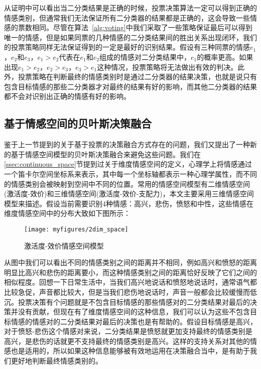 从证明中可以看出当二分类结果是正确的时候，投票决策算法一定可以得到正确的情感类别，但通常我们无法保证所有二分类器的结果都是正确的，这会导致一些情感的票数相同。尽管在算法~\ref{alg:voting}中我们采取了一些策略保证最后可以得到唯一的情感，但是如果同票的几种情感的二分类结果间的胜出关系出现闭环，我们的投票策略同样无法保证得到的一定是最好的识别结果。假设有三种同票的情感$e_1$，$e_2$和$e_3$，$e_1>e_2$代表在$e_1$和$e_2$组成的情感对二分类结果中，$e_1$的概率更高。如果出现$e_1>e_2$，$e_2>e_3$，$e_3>e_1$这种情况，投票策略将无法做出有效的判决。此外，投票策略在判断最终的情感类别时是通过二分类器的结果决策，也就是说只有包含目标情感的那些二分类器才对最终的结果有好的影响，而其他二分类器的结果都不会对识别出正确的情感有好的影响。

\subsection{基于情感空间的贝叶斯决策融合}
鉴于上一节提到的关于基于投票的决策融合方式存在的问题，我们又提出了一种新的基于情感空间模型的贝叶斯决策融合来避免这些问题。我们在\ref{ssec:continuous_space}节提到过关于维度情感空间的定义，心理学上将情感通过一个笛卡尔空间坐标系来表示，其中每一个坐标轴都表示一种心理学属性，而不同的情感类别会被映射到空间中不同的位置。常用的情感空间模型有二维情感空间(激活度-效价)和三维情感空间(激活度-效价-支配力)，本文主要采用三维情感空间模型来描述。假设当前需要识别4种情感：高兴，悲伤，愤怒和中性，这些情感在维度情感空间中的分布大致如下图所示：

\begin{figure}[H] %
    \centering
    \texttt{[image: myfigures/2dim\_space]}
    \caption{激活度-效价情感空间模型}
    \label{fig:xfig1}
\end{figure}

从图中我们可以看出不同的情感类别之间的距离并不相同，例如高兴和愤怒的距离明显比高兴和悲伤的距离要小，而这种情感类别之间的距离恰好反映了它们之间的相似程度。回想一下日常生活中，当我们高兴地说话和愤怒地说话时，通常语气都比较急促，声音都比较大，但是当我们悲伤地说话时，声音一般都会比较缓慢而低沉。投票决策有个问题就是不包含目标情感的那些情感对的二分类结果对最后的决策并没有贡献，但现在有了维度情感空间的这种信息，我们可以认为这些不包含目标情感的情感对的二分类结果对最后的决策也是有帮助的。假设目标情感是高兴，对于愤怒-悲伤这个情感对来说，二分类结果是愤怒就更加支持最终的情感类别是高兴，是悲伤的话就更不支持最终的情感类别是高兴。这样的支持关系对其他的情感也是适用的，所以如果这种信息能够被有效地运用在决策融合当中，是有助于我们更好地判断最终情感类别的。

